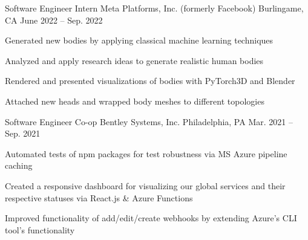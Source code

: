

\begin{cventries}
  \cventry
  {Software Engineer Intern} %
  {Meta Platforms, Inc. (formerly Facebook)} %
  {Burlingame, CA} %
  {June 2022 -- Sep. 2022} %
  {
    \begin{cvitems} %
      \item {Generated new bodies by applying classical machine learning techniques}
      \item {Analyzed and apply research ideas to generate realistic human bodies}
      \item {Rendered and presented visualizations of bodies with PyTorch3D and Blender}
      \item {Attached new heads and wrapped body meshes to different topologies}
    \end{cvitems}
  }

  \cventry
  {Software Engineer Co-op} %
  {Bentley Systems, Inc.} %
  {Philadelphia, PA} %
  {Mar. 2021 -- Sep. 2021} %
  {
    \begin{cvitems} %
      \item {Automated tests of npm packages for test robustness via MS Azure pipeline caching}
      \item {Created a responsive dashboard for visualizing our global services and their respective statuses via React.js \& Azure Functions}
      \item {Improved functionality of add/edit/create webhooks by extending Azure's CLI tool's functionality}
    \end{cvitems}
  }


\end{cventries}
